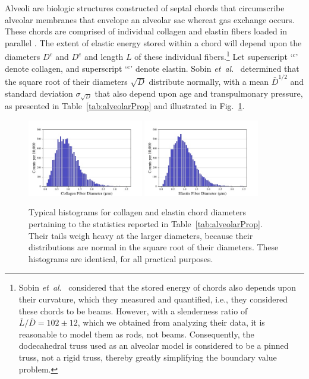 Alveoli are biologic structures constructed of septal chords that circumscribe alveolar membranes that envelope an alveolar sac whereat gas exchange occurs.  These chords are comprised of individual collagen and elastin fibers loaded in parallel \cite{Matsudaetal87,Sobinetal88}.  The extent of elastic energy stored within a chord will depend upon the diameters $D^c$ and $D^e$ and length $L$ of these individual fibers.\footnote{
	Sobin \textit{et~al}.\ \cite{Sobinetal88} considered that the stored energy of chords also depends upon their curvature, which they measured and quantified, i.e., they considered these chords to be beams.  However, with a slenderness ratio of $\bar{L}/\bar{D} = 102 \pm 12$, which we obtained from analyzing their data, it is reasonable to model them as rods, not beams.  Consequently, the dodecahedral truss used as an alveolar model is considered to be a pinned truss, not a rigid truss, thereby greatly simplifying the boundary value problem.
}
Let superscript `$\mbox{}^c$' denote collagen, and superscript `$\mbox{}^e$' denote elastin.  Sobin \textit{et~al}.\ \cite{Sobinetal88} determined that the square root of their diameters $\sqrt{D}$ distribute normally, with a mean $\bar{D}^{1/2}$ and standard deviation $\sigma_{\sqrt{D}}$ that also depend upon age and transpulmonary pressure, as presented in Table~\ref{tab:alveolarProp} and illustrated in Fig.~\ref{fig:septalChordStats}. 

\begin{figure}
    \centering
    \includegraphics[width=0.45\textwidth]{figures/collagenFiberDiaHistogram.jpg}
    \includegraphics[width=0.45\textwidth]{figures/elastinFiberDiaHistogram.jpg}
    \caption{Typical histograms for collagen and elastin chord diameters pertaining to the statistics reported in Table~\ref{tab:alveolarProp}.  Their tails weigh heavy at the larger diameters, because their distributions are normal in the square root of their diameters.  These histograms are identical, for all practical purposes.}
    \label{fig:septalChordStats}
\end{figure}

